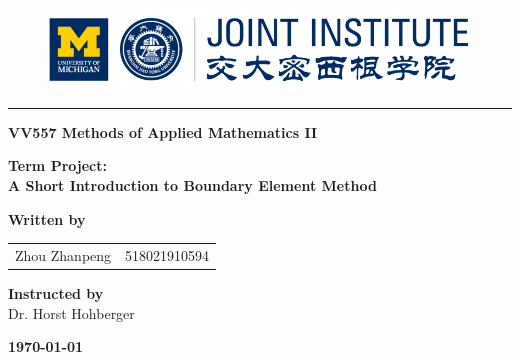 \documentclass[a4paper,12pt]{article}
\begin{document}
\begin{titlepage}

\begin{figure}[!htbp]
\center
\includegraphics[scale=0.7,width=12cm]{ji_logo.png}
\end{figure}

\noindent\rule[0.25\baselineskip]{\textwidth}{1pt}

\begin{center}

\Large{\bfseries  VV557 Methods of Applied Mathematics II}

\vspace{2cm}

\Large{\bfseries  Term Project:}\\
\Huge{{\bfseries A Short Introduction to Boundary Element Method}}

\vspace{5cm}

\large{\textbf{Written by}}\\ 

\begin{tabular}{l l}
Zhou Zhanpeng & 518021910594\\
\end{tabular}

\textbf{Instructed by}\\
Dr. Horst Hohberger\\

\vspace{3cm}


{\bfseries \today}\\

\vspace{0.5cm}


\end{center}

\end{titlepage}
\end{document}
